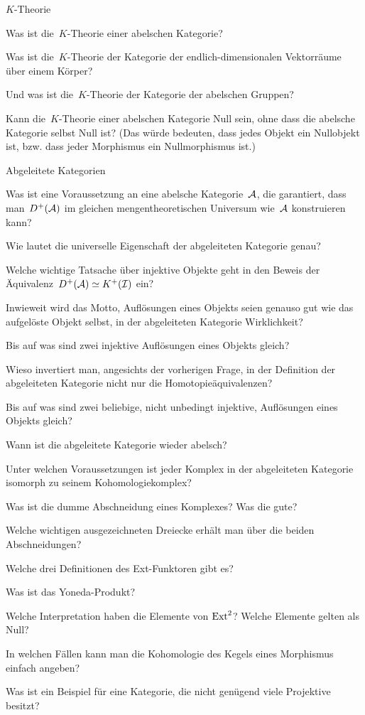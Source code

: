 \documentclass{uebblatt}
\begin{document}
\begin{aufgabeE}{$K$-Theorie}
\item Was ist die~$K$-Theorie einer abelschen Kategorie?
\item Was ist die~$K$-Theorie der Kategorie der endlich-dimensionalen
Vektorräume über einem Körper?
\item Und was ist die~$K$-Theorie der Kategorie der abelschen Gruppen?
\item Kann die~$K$-Theorie einer abelschen Kategorie Null sein, ohne dass die
abelsche Kategorie selbst Null ist? (Das würde bedeuten, dass jedes Objekt ein
Nullobjekt ist, bzw. dass jeder Morphismus ein Nullmorphismus ist.)
\end{aufgabeE}

\begin{aufgabeE}{Abgeleitete Kategorien}
\item Was ist eine Voraussetzung an eine abelsche Kategorie~$\mathcal{A}$, die
garantiert, dass man~$D^+(\mathcal{A})$ im gleichen mengentheoretischen Universum wie~$\mathcal{A}$
konstruieren kann?
\item Wie lautet die universelle Eigenschaft der abgeleiteten Kategorie
genau?
\item Welche wichtige Tatsache über injektive Objekte geht in den Beweis der
Äquivalenz~$D^+(\mathcal{A}) \simeq K^+(\mathcal{I})$ ein?
\item Inwieweit wird das Motto, Auflösungen eines Objekts seien genauso gut wie
das aufgelöste Objekt selbst, in der abgeleiteten Kategorie Wirklichkeit?
\item Bis auf was sind zwei injektive Auflösungen eines Objekts gleich?
\item Wieso invertiert man, angesichts der vorherigen Frage, in der Definition
der abgeleiteten Kategorie nicht nur die Homotopieäquivalenzen?
\item Bis auf was sind zwei beliebige, nicht unbedingt injektive, Auflösungen
eines Objekts gleich?
\item Wann ist die abgeleitete Kategorie wieder abelsch?
\item Unter welchen Voraussetzungen ist jeder Komplex in der abgeleiteten
Kategorie isomorph zu seinem Kohomologiekomplex?
\item Was ist die dumme Abschneidung eines Komplexes? Was die gute?
\item Welche wichtigen ausgezeichneten Dreiecke erhält man über die beiden
Abschneidungen?
\item Welche drei Definitionen des Ext-Funktoren gibt es?
\item Was ist das Yoneda-Produkt?
\item Welche Interpretation haben die Elemente von $\mathrm{Ext}^2$? Welche Elemente
gelten als Null?
\item In welchen Fällen kann man die Kohomologie des Kegels eines Morphismus
einfach angeben?
\item Was ist ein Beispiel für eine Kategorie, die nicht genügend viele
Projektive besitzt?
\end{aufgabeE}
\end{document}
